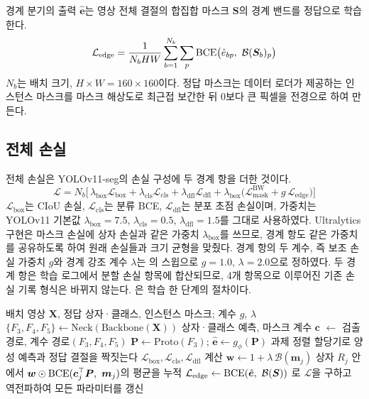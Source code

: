 경계 분기의 출력 $\hat{\bm{e}}$는 영상 전체 결절의 합집합 마스크 $\bm{S}$의 경계 밴드를 정답으로 학습한다.
\begin{equation}
  \mathcal{L}_{\text{edge}} = \frac{1}{N_b H W}\sum_{b=1}^{N_b}\sum_{p} \BCE\!\big(\hat{e}_{bp},\ \mathcal{B}(\bm{S}_b)_p\big)
  \label{eq:edge_loss}
\end{equation}
$N_b$는 배치 크기, $H\times W = 160\times160$이다. 정답 마스크는 데이터 로더가 제공하는 인스턴스 마스크를
마스크 해상도로 최근접 보간한 뒤 0보다 큰 픽셀을 전경으로 하여 만든다.

\subsection{전체 손실}

전체 손실은 YOLOv11-seg의 손실 구성에 두 경계 항을 더한 것이다.
\begin{equation}
  \mathcal{L} = N_b\Big[\,\lambda_{\text{box}}\mathcal{L}_{\text{box}} + \lambda_{\text{cls}}\mathcal{L}_{\text{cls}}
  + \lambda_{\text{dfl}}\mathcal{L}_{\text{dfl}}
  + \lambda_{\text{box}}\big(\mathcal{L}_{\text{mask}}^{\text{BW}} + g\,\mathcal{L}_{\text{edge}}\big)\Big]
  \label{eq:total_loss}
\end{equation}
$\mathcal{L}_{\text{box}}$는 CIoU 손실, $\mathcal{L}_{\text{cls}}$는 분류 BCE, $\mathcal{L}_{\text{dfl}}$는
분포 초점 손실이며, 가중치는 YOLOv11 기본값 $\lambda_{\text{box}}=7.5$, $\lambda_{\text{cls}}=0.5$,
$\lambda_{\text{dfl}}=1.5$를 그대로 사용하였다. Ultralytics 구현은 마스크 손실에 상자 손실과 같은 가중치
$\lambda_{\text{box}}$를 쓰므로, 경계 항도 같은 가중치를 공유하도록 하여 원래 손실들과 크기 균형을 맞췄다.
경계 항의 두 계수, 즉 보조 손실 가중치 $g$와 경계 강조 계수 $\lambda$는 의 스윕으로
$g=1.0$, $\lambda=2.0$으로 정하였다. 두 경계 항은 학습 로그에서 분할 손실 항목에 합산되므로,
4개 항목으로 이루어진 기존 손실 기록 형식은 바뀌지 않는다. 은 학습 한 단계의 절차이다.

\begin{algorithm}[htbp]
\caption{\BRM{} 학습 한 단계}\label{alg:train_step}
\begin{algorithmic}[1]
\Require 배치 영상 $\bm{X}$, 정답 상자·클래스, 인스턴스 마스크; 계수 $g$, $\lambda$
\State $\{F_3,F_4,F_5\} \gets \mathrm{Neck}(\mathrm{Backbone}(\bm{X}))$
\State 상자·클래스 예측, 마스크 계수 $\bm{c}$ $\gets$ 검출 경로, 계수 경로$(F_3,F_4,F_5)$
\State $\bm{P} \gets \mathrm{Proto}(F_3)$; \quad $\hat{\bm{e}} \gets g_\phi(\bm{P})$ 
\State 과제 정렬 할당기로 양성 예측과 정답 결절을 짝짓는다
\State $\mathcal{L}_{\text{box}}, \mathcal{L}_{\text{cls}}, \mathcal{L}_{\text{dfl}}$ 계산
  \State $\bm{w} \gets 1 + \lambda\,\mathcal{B}(\bm{m}_j)$ 
  \State 상자 $R_j$ 안에서 $\bm{w}\odot\BCE(\bm{c}_j^{\top}\bm{P},\ \bm{m}_j)$의 평균을 누적
\EndFor
\State $\mathcal{L}_{\text{edge}} \gets \BCE(\hat{\bm{e}},\ \mathcal{B}(\bm{S}))$ 
\State {}로 $\mathcal{L}$을 구하고 역전파하여 모든 파라미터를 갱신
\end{algorithmic}
\end{algorithm}

